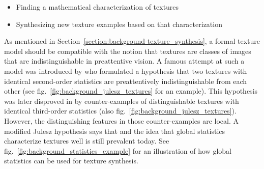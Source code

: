 \begin{itemize}
    \item Finding a mathematical characterization of textures
    \item Synthesizing new texture examples based on that characterization
\end{itemize}

As mentioned in Section~\ref{section:background-texture_synthesis}, a formal texture model should be compatible with the notion that textures are classes of images that are indistinguishable in preattentive vision. A famous attempt at such a model was introduced by \citet{Julesz1962} who formulated a hypothesis that two textures with identical second-order statistics are preattentively indistinguishable from each other (see fig.~\ref{fig:background_julesz_textures} for an example). This hypothesis was later disproved in \citet{Julesz1973} by counter-examples of distinguishable textures with identical third-order statistics (also fig.~\ref{fig:background_julesz_textures}). However, the distinguishing features in those counter-examples are local. A modified Julesz hypothesis says that  and the idea that global statistics characterize textures well is still prevalent today. See fig.~\ref{fig:background_statistics_example} for an illustration of how global statistics can be used for texture synthesis.

